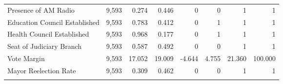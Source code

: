 \begin{table}[!htbp]
\begin{tabular}{@{\extracolsep{5pt}}lD{.}{.}{-3} D{.}{.}{-3} D{.}{.}{-3} D{.}{.}{-3} D{.}{.}{-3} D{.}{.}{-3} D{.}{.}{-3} }
Presence of AM Radio & 9,593 & 0.274 & 0.446 & 0 & 0 & 1 & 1 \\ 
Education Council Established & 9,593 & 0.783 & 0.412 & 0 & 1 & 1 & 1 \\ 
Health Council Established & 9,593 & 0.968 & 0.177 & 0 & 1 & 1 & 1 \\ 
Seat of Judiciary Branch & 9,593 & 0.587 & 0.492 & 0 & 0 & 1 & 1 \\ 
Vote Margin & 9,593 & 17.052 & 19.009 & -4.644 & 4.755 & 21.360 & 100.000 \\ 
Mayor Reelection Rate & 9,593 & 0.309 & 0.462 & 0 & 0 & 1 & 1 \\ 
\hline \\[-1.8ex] 
\end{tabular} 
\end{table} 
